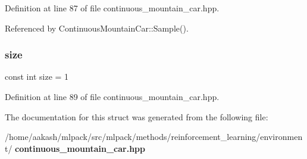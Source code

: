 Definition at line 87 of file continuous\+\_\+mountain\+\_\+car.\+hpp.



Referenced by Continuous\+Mountain\+Car\+::\+Sample().

\mbox{\label{structmlpack_1_1rl_1_1ContinuousMountainCar_1_1Action_aab938108caad0d0e47d6885b5ba2d23a}} 
\subsubsection{size}
{\footnotesize\ttfamily const int size = 1}



Definition at line 89 of file continuous\+\_\+mountain\+\_\+car.\+hpp.



The documentation for this struct was generated from the following file\+:\begin{DoxyCompactItemize}
\item 
/home/aakash/mlpack/src/mlpack/methods/reinforcement\+\_\+learning/environment/\textbf{ continuous\+\_\+mountain\+\_\+car.\+hpp}\end{DoxyCompactItemize}

